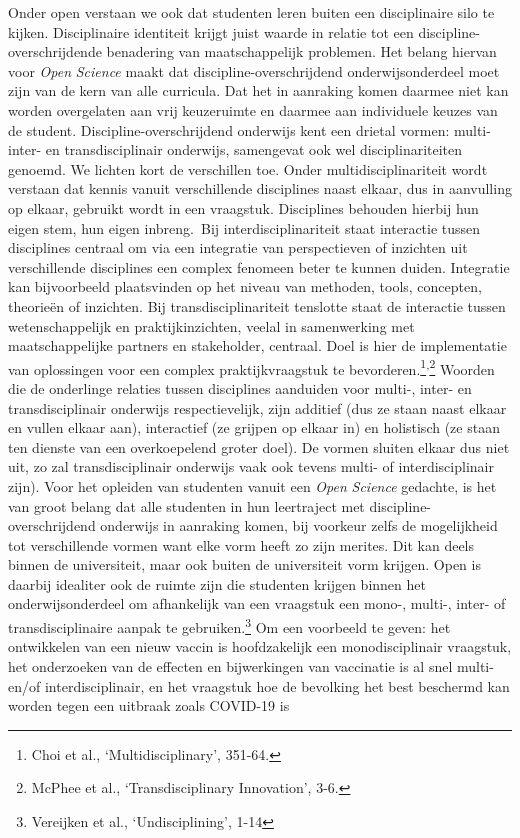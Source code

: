 \documentclass[smallauthor, chapterhaspagenum, nochapterinheader, pagenuminheader,  bigchapnum,medium2, tocpages, garamond, titleinheader]{jote-book}
\begin{document}
	Onder open verstaan we ook dat studenten leren buiten een disciplinaire silo te kijken. Disciplinaire identiteit krijgt juist waarde in relatie tot een discipline-overschrijdende benadering van maatschappelijk problemen. Het belang hiervan voor \emph{Open }\emph{Science} maakt dat discipline-overschrijdend onderwijsonderdeel moet zijn van de kern van alle curricula. Dat het in aanraking komen daarmee niet kan worden overgelaten aan vrij keuzeruimte en daarmee aan individuele keuzes van de student. Discipline-overschrijdend onderwijs kent een drietal vormen: multi- inter- en transdisciplinair onderwijs, samengevat ook wel disciplinariteiten genoemd. We lichten kort de verschillen toe. Onder multidisciplinariteit wordt verstaan dat kennis vanuit verschillende disciplines naast elkaar, dus in aanvulling op elkaar, gebruikt wordt in een vraagstuk. Disciplines behouden hierbij hun eigen stem, hun eigen inbreng. Bij interdisciplinariteit staat interactie tussen disciplines centraal om via een integratie van perspectieven of inzichten uit verschillende disciplines een complex fenomeen beter te kunnen duiden. Integratie kan bijvoorbeeld plaatsvinden op het niveau van methoden, tools, concepten, theorieën of inzichten. Bij transdisciplinariteit tenslotte staat de interactie tussen wetenschappelijk en praktijkinzichten, veelal in samenwerking met maatschappelijke partners en stakeholder, centraal. Doel is hier de implementatie van oplossingen voor een complex praktijkvraagstuk te bevorderen.\footnote{Choi et al., ‘Multidisciplinary', 351-64.}\textsuperscript{,}\footnote{McPhee et al., ‘Transdisciplinary Innovation', 3-6.} Woorden die de onderlinge relaties tussen disciplines aanduiden voor multi-, inter- en transdisciplinair onderwijs respectievelijk, zijn additief (dus ze staan naast elkaar en vullen elkaar aan), interactief (ze grijpen op elkaar in) en holistisch (ze staan ten dienste van een overkoepelend groter doel). De vormen sluiten elkaar dus niet uit, zo zal transdisciplinair onderwijs vaak ook tevens multi- of interdisciplinair zijn). Voor het opleiden van studenten vanuit een \emph{Open }\emph{Science} gedachte, is het van groot belang dat alle studenten in hun leertraject met discipline-overschrijdend onderwijs in aanraking komen, bij voorkeur zelfs de mogelijkheid tot verschillende vormen want elke vorm heeft zo zijn merites. Dit kan deels binnen de universiteit, maar ook buiten de universiteit vorm krijgen. Open is daarbij idealiter ook de ruimte zijn die studenten krijgen binnen het onderwijsonderdeel om afhankelijk van een vraagstuk een mono-, multi-, inter- of transdisciplinaire aanpak te gebruiken.\footnote{Vereijken et al., ‘Undisciplining', 1-14} Om een voorbeeld te geven: het ontwikkelen van een nieuw vaccin is hoofdzakelijk een monodisciplinair vraagstuk, het onderzoeken van de effecten en bijwerkingen van vaccinatie is al snel multi- en/of interdisciplinair, en het vraagstuk hoe de bevolking het best beschermd kan worden tegen een uitbraak zoals COVID-19 is 
\end{document}
